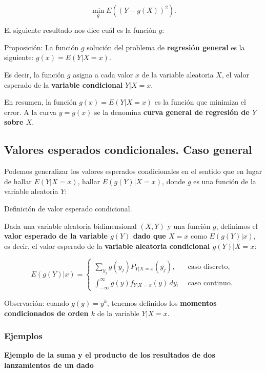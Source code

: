 \documentclass[]{book}
\begin{document}
\[
\min_g E\left((Y-g(X))^2\right).
\]

El siguiente resultado nos dice cuál es la función \(g\):

Proposición:
La función \(g\) solución del problema de \textbf{regresión general} es la siguiente: \(g(x)=E(Y|X=x)\).

Es decir, la función \(g\) asigna a cada valor \(x\) de la variable aleatoria \(X\), el valor esperado de la \textbf{variable condicional} \(Y|X=x\).

En resumen, la función \(g(x)=E(Y|X=x)\) es la función que minimiza el error. A la curva \(y=g(x)\) se la denomina \textbf{curva general de regresión de \(Y\) sobre \(X\)}.

\hypertarget{valores-esperados-condicionales.-caso-general}{%
\subsection{Valores esperados condicionales. Caso general}\label{valores-esperados-condicionales.-caso-general}}

Podemos generalizar los valores esperados condicionales en el sentido que en lugar de hallar \(E(Y|X=x)\), hallar \(E(g(Y)|X=x)\), donde \(g\) es una función de la variable aleatoria \(Y\):

Definición de valor esperado condicional.

Dada una variable aleatoria bidimensional \((X,Y)\) y una función \(g\), definimos el \textbf{valor esperado de la variable \(g(Y)\) dado que \(X=x\)} como \(E(g(Y)|x)\), es decir, el valor esperado de la \textbf{variable aleatoria condicional \(g(Y)|X=x\)}:

\[
E(g(Y)|x)=\begin{cases}
\sum_{y_j} g(y_j) P_{Y|X=x}(y_j), & \mbox{ caso discreto,}\\
\int_{-\infty}^\infty g(y) f_{Y|X=x}(y)\,dy, & \mbox{ caso continuo.}
\end{cases}
\]

Observación: cuando \(g(y)=y^k\), tenemos definidos los \textbf{momentos condicionados de orden \(k\)} de la variable \(Y|X=x\).

\hypertarget{ejemplos-8}{%
\subsubsection{Ejemplos}\label{ejemplos-8}}

\textbf{Ejemplo de la suma y el producto de los resultados de dos lanzamientos de un dado}
\end{document}

